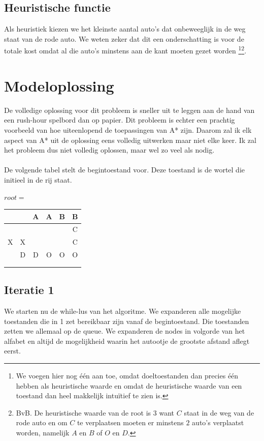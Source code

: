 \documentclass[alternative-exam.tex]{subfiles}
\begin{document}
\subsection{Heuristische functie} Als heuristiek kiezen we het kleinste aantal auto's dat onbeweeglijk in de weg staat van de rode auto. We weten zeker dat dit een onderschatting is voor de totale kost omdat al die auto's minstens aan de kant moeten gezet worden
\footnote{We voegen hier nog één aan toe, omdat doeltoestanden dan precies één hebben als heuristische waarde en omdat de heuristische waarde van een toestand dan heel makkelijk intu\"itief te zien is.}\footnote{BvB. De heuristische waarde van de root is $3$ want $C$ staat in de weg van de rode auto en om $C$ te verplaatsen moeten er minstens $2$ auto's verplaatst worden, namelijk $A$ en $B$ of $O$ en $D$.}.

\section{Modeloplossing}
De volledige oplossing voor dit probleem is sneller uit te leggen aan de hand van een rush-hour spelbord dan op papier. Dit probleem is echter een prachtig voorbeeld van hoe uiteenlopend de toepassingen van A* zijn. Daarom zal ik elk aspect van A* uit de oplossing eens volledig uitwerken maar niet elke keer. Ik zal het probleem dus niet volledig oplossen, maar wel zo veel als nodig.\\\\
De volgende tabel stelt de begintoestand voor. Deze toestand is de wortel die initieel in de rij staat.
\begin{center}
$root = $
\begin{tabular}{| c | c | c | c | c | c |}
\hline
   &   & A & A & B & B \\ \hline
   &   &   &   &   & C \\ \hline
 X & X &   &   &   & C \\ \hline
   & D & D & O & O & O \\ \hline
   &   &   &   &   &   \\ \hline
   &   &   &   &   &   \\
\hline
\end{tabular}
\end{center}

\subsection{Iteratie 1}
We starten nu de while-lus van het algoritme. We expanderen alle mogelijke toestanden die in 1 zet bereikbaar zijn vanaf de begintoestand. Die toestanden zetten we allemaal op de queue. We expanderen de nodes in volgorde van het alfabet en altijd de mogelijkheid waarin het autootje de grootste afstand aflegt eerst.
\end{document}
